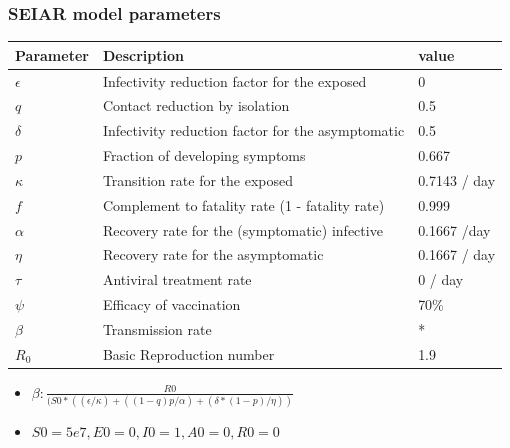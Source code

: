 \documentclass[usenames,dvipsnames, aspectratio=169, 9pt]{beamer}
\begin{document}
\begin{frame}\frametitle{SEIAR model parameters}
\begin{table}[]
\begin{tabular}{lll}
\hline
Parameter & Description                                       & value        \\ \hline
$\epsilon$   & Infectivity reduction factor for the exposed      & 0            \\
$q$         & Contact reduction by isolation                    & 0.5          \\
$\delta$     & Infectivity reduction factor for the asymptomatic & 0.5          \\
$p$         & Fraction of developing symptoms                   & 0.667        \\
$\kappa$     & Transition rate for the exposed                   & 0.7143 / day \\
$f$         & Complement to fatality rate (1 - fatality rate)   & 0.999        \\
$\alpha$     & Recovery rate for the (symptomatic) infective     & 0.1667 /day  \\
$\eta$       & Recovery rate for the asymptomatic                & 0.1667 / day \\
$\tau$       & Antiviral treatment rate                          & 0 / day      \\
$\psi$       & Efficacy of vaccination                           & 70\%         \\ 
$\beta$    & Transmission rate                                 & *           \\
$R_{0}$     & Basic Reproduction number                         & 1.9           \\\hline
\end{tabular}
\end{table}
\begin{itemize}
    \item $\beta : \frac{R0}{(S0 * ((\epsilon / \kappa) + ((1 - q)p/\alpha) + (\delta*(1-p)/\eta))}$
    \item $S0 = 5e7,   E0 = 0,    I0 = 1,     A0 = 0,     R0 = 0$
\end{itemize}
\end{frame}


\end{document}
